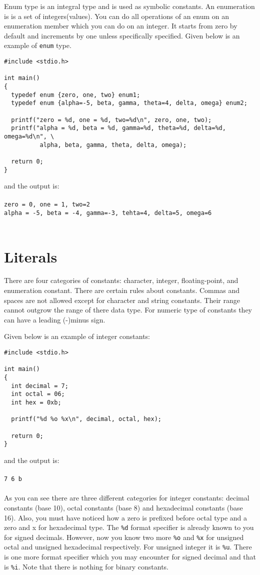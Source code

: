 Enum type is an integral type and is used as symbolic constants. An enumeration
is is a set of integers(values). You can do all operations of an enum on an
enumeration member which you can do on an integer. It starts from zero by
default and increments by one unless specifically specified. Given below is an
example of \texttt{enum} type.

\begin{verbatim}
#include <stdio.h>

int main()
{
  typedef enum {zero, one, two} enum1;
  typedef enum {alpha=-5, beta, gamma, theta=4, delta, omega} enum2;

  printf("zero = %d, one = %d, two=%d\n", zero, one, two);
  printf("alpha = %d, beta = %d, gamma=%d, theta=%d, delta=%d, omega=%d\n", \
          alpha, beta, gamma, theta, delta, omega);

  return 0;
}
\end{verbatim}

and the output is:
\\\\\texttt{zero = 0, one = 1, two=2\\
alpha = -5, beta = -4, gamma=-3, tehta=4, delta=5, omega=6\\\\}

\section{Literals}
There are four categories of constants: character, integer, floating-point, and
enumeration constant. There are certain rules about constants. Commas and
spaces are not allowed except for character and string constants. Their range
cannot outgrow the range of there data type. For numeric type of constants they
can have a leading (-)minus sign.

Given below is an example of integer constants:

\begin{verbatim}
#include <stdio.h>

int main()
{
  int decimal = 7;
  int octal = 06;
  int hex = 0xb;

  printf("%d %o %x\n", decimal, octal, hex);

  return 0;
}
\end{verbatim}

and the output is:
\\\\\texttt{7 6 b\\\\}
As you can see there are three different categories for integer constants:
decimal constants (base 10), octal constants (base 8) and hexadecimal constants
(base 16). Also, you must have noticed how a zero is prefixed before octal type
and a zero and x for hexadecimal type. The \texttt{\%d} format specifier is
already known to you for signed decimals. However, now you know two more
\texttt{\%o} and \texttt{\%x} for unsigned octal and unsigned hexadecimal
respectively. For unsigned integer it is \texttt{\%u}. There is one more format
specifier which you may encounter for signed decimal and that is
\texttt{\%i}. Note that there is nothing for binary constants.

